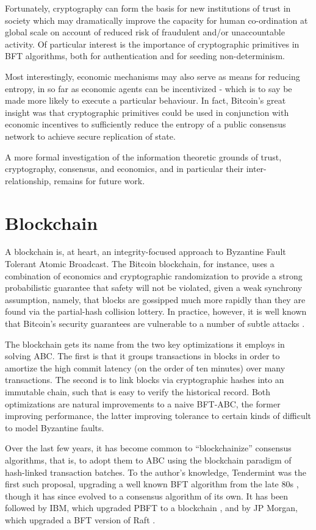 Fortunately, cryptography can form the basis for new institutions of trust in society 
which may dramatically improve the capacity for human co-ordination at global scale on account
of reduced risk of fraudulent and/or unaccountable activity.
Of particular interest is the importance of cryptographic primitives in BFT algorithms,
both for authentication and for seeding non-determinism.

Most interestingly, economic mechanisms may also serve as means for reducing entropy,
in so far as economic agents can be incentivized - 
which is to say be made more likely to execute a particular behaviour.
In fact, Bitcoin's great insight was that cryptographic primitives could be used in
conjunction with economic incentives to sufficiently reduce the entropy of a public consensus network
to achieve secure replication of state.

A more formal investigation of the information theoretic grounds of trust, cryptography,
consensus, and economics, and in particular their inter-relationship, remains for future work.

\section{Blockchain}

A blockchain is, at heart, an integrity-focused approach to Byzantine Fault Tolerant Atomic Broadcast.
The Bitcoin blockchain, for instance, uses a combination of economics and cryptographic randomization 
to provide a strong probabilistic guarantee that safety will not be violated, 
given a weak synchrony assumption, namely, 
that blocks are gossipped much more rapidly than they are found via the partial-hash collision lottery.
In practice, however, it is well known that Bitcoin's security guarantees are vulnerable to a number 
of subtle attacks \cite{courtois2014subversive,eyal2014majority}.


The blockchain gets its name from the two key optimizations it employs in solving ABC.
The first is that it groups transactions in blocks in order to amortize the high commit latency 
(on the order of ten minutes) over many transactions.
The second is to link blocks via cryptographic hashes into an immutable chain,
such that is easy to verify the historical record.
Both optimizations are natural improvements to a naive BFT-ABC,
the former improving performance, the latter improving tolerance to certain kinds 
of difficult to model Byzantine faults.

Over the last few years, it has become common to ``blockchainize'' consensus algorithms,
that is, to adopt them to ABC using the blockchain paradigm of hash-linked transaction batches.
To the author's knowledge, Tendermint was the first such proposal, 
upgrading a well known BFT algorithm from the late 80s \cite{dls},
though it has since evolved to a consensus algorithm of its own.
It has been followed by IBM, which upgraded PBFT to a blockchain \cite{cachin2016non,obc},
and by JP Morgan, which upgraded a BFT version of Raft \cite{juno}.

